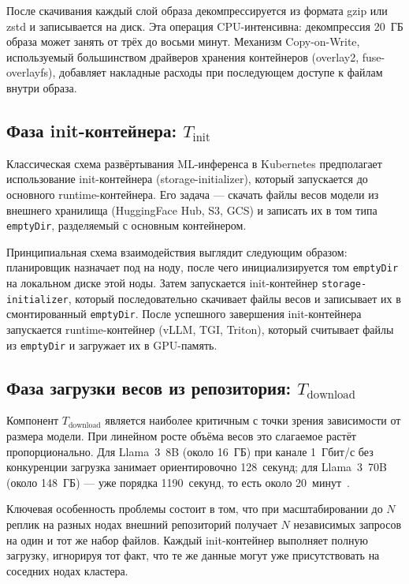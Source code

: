 После скачивания каждый слой образа декомпрессируется из формата gzip или zstd и записывается на диск. Эта операция CPU-интенсивна: декомпрессия 20~ГБ образа может занять от трёх до восьми минут. Механизм Copy-on-Write, используемый большинством драйверов хранения контейнеров (overlay2, fuse-overlayfs), добавляет накладные расходы при последующем доступе к файлам внутри образа.

\subsection{Фаза init-контейнера: $T_{\mathrm{init}}$}

Классическая схема развёртывания ML-инференса в Kubernetes предполагает использование init-контейнера (storage-initializer), который запускается до основного runtime-контейнера. Его задача --- скачать файлы весов модели из внешнего хранилища (HuggingFace Hub, S3, GCS) и записать их в том типа \texttt{emptyDir}, разделяемый с основным контейнером.

Принципиальная схема взаимодействия выглядит следующим образом: планировщик назначает под на ноду, после чего инициализируется том \texttt{emptyDir} на локальном диске этой ноды. Затем запускается init-контейнер \texttt{storage-initializer}, который последовательно скачивает файлы весов и записывает их в смонтированный \texttt{emptyDir}. После успешного завершения init-контейнера запускается runtime-контейнер (vLLM, TGI, Triton), который считывает файлы из \texttt{emptyDir} и загружает их в GPU-память.

\subsection{Фаза загрузки весов из репозитория: $T_{\mathrm{download}}$}

Компонент $T_{\mathrm{download}}$ является наиболее критичным с точки зрения зависимости от размера модели. При линейном росте объёма весов это слагаемое растёт пропорционально. Для Llama~3~8B (около 16~ГБ) при канале 1~Гбит/с без конкуренции загрузка занимает ориентировочно 128~секунд; для Llama~3~70B (около 148~ГБ) --- уже порядка 1190~секунд, то есть около 20~минут~\cite{bentoml2024cold}.

Ключевая особенность проблемы состоит в том, что при масштабировании до $N$ реплик на разных нодах внешний репозиторий получает $N$ независимых запросов на один и тот же набор файлов. Каждый init-контейнер выполняет полную загрузку, игнорируя тот факт, что те же данные могут уже присутствовать на соседних нодах кластера.

